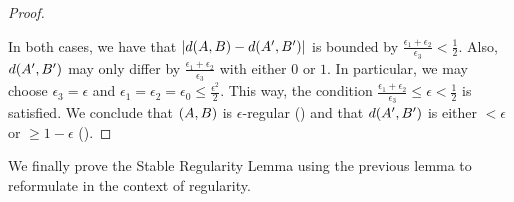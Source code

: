 \begin{lemma}[Lemma 5.17]
\begin{proof}
\begin{itemize}
                \end{itemize}
                In both cases, we have that $| d ( A,B ) - d ( A',B' ) |$ is bounded by
                $\frac{\epsilon_1 + \epsilon_2}{\epsilon_3} < \frac{1}{2}$.
                Also, $d ( A', B' )$ may only differ by $\frac{\epsilon_1 + \epsilon_2}{\epsilon_3}$ with either
                $0$ or $1$.
                In particular, we may choose $\epsilon_3 = \epsilon$ and $\epsilon_1 = \epsilon_2 = \epsilon_0 \leq \frac{\epsilon^2}{2}$.
                This way, the condition $\frac{\epsilon_1 + \epsilon_2}{\epsilon_3} \leq \epsilon < \frac{1}{2}$ is satisfied.
                We conclude that $( A,B )$ is $\epsilon$-regular () and that $d ( A',B' )$ is either
                $< \epsilon$ or $\geq 1 - \epsilon$ ().
            \end{proof}
        \end{lemma}

        We finally prove the Stable Regularity Lemma using the previous lemma to reformulate
         in the context of regularity.

